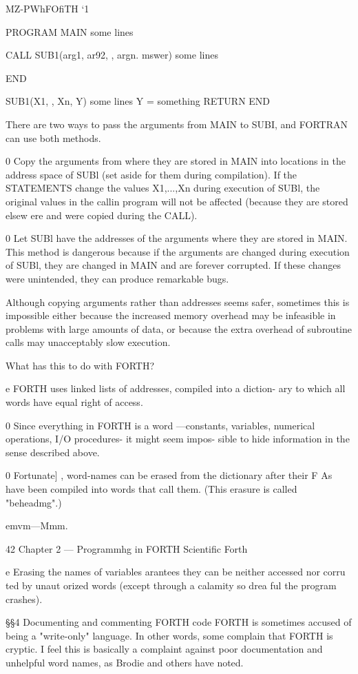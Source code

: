 MZ-PWhFOfiTH ‘1

PROGRAM MAIN
some lines

CALL SUB1(arg1, ar92, , argn. mswer)
some lines

END

SUB1(X1, , Xn, Y)
some lines
Y = something
RETURN
END

There are two ways to pass the arguments from MAIN to SUBI,
and FORTRAN can use both methods.

0 Copy the arguments from where they are stored in MAIN into
locations in the address space of SUBl (set aside for them
during compilation). If the STATEMENTS change the values
X1,...,Xn during execution of SUBl, the original values in the
callin program will not be affected (because they are stored
elsew ere and were copied during the CALL).

0 Let SUBl have the addresses of the arguments where they are
stored in MAIN. This method is dangerous because if the
arguments are changed during execution of SUBl, they are
changed in MAIN and are forever corrupted. If these changes
were unintended, they can produce remarkable bugs.

Although copying arguments rather than addresses seems safer,
sometimes this is impossible either because the increased
memory overhead may be infeasible in problems with large
amounts of data, or because the extra overhead of subroutine calls
may unacceptably slow execution.

What has this to do with FORTH?

e FORTH uses linked lists of addresses, compiled into a diction-
ary to which all words have equal right of access.

0 Since everything in FORTH is a word —constants, variables,
numerical operations, I/O procedures- it might seem impos-
sible to hide information in the sense described above.

0 Fortunate] , word-names can be erased from the dictionary
after their F As have been compiled into words that call them.
(This erasure is called "beheadmg".)

emvm—Mmm.

42 Chapter 2 — Programmhg in FORTH Scientific Forth

e Erasing the names of variables arantees they can be neither
accessed nor corru ted by unaut orized words (except through
a calamity so drea ful the program crashes).

§§4 Documenting and commenting FORTH code
FORTH is sometimes accused of being a "write-only" language. In other words, some complain that FORTH is cryptic. I feel this is basically a complaint against poor documentation and unhelpful word names, as Brodie and others have noted.

